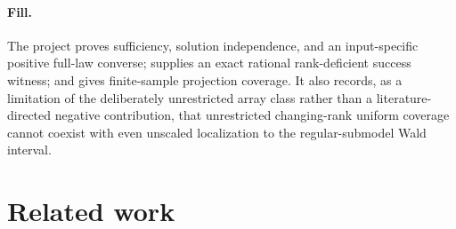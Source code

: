 \documentclass{article}
\begin{document}
\paragraph{Fill.} The project proves sufficiency, solution independence, and an input-specific positive full-law converse; supplies an exact rational rank-deficient success witness; and gives finite-sample projection coverage. It also records, as a limitation of the deliberately unrestricted array class rather than a literature-directed negative contribution, that unrestricted changing-rank uniform coverage cannot coexist with even unscaled localization to the regular-submodel Wald interval.

\section{Related work}
\end{document}
